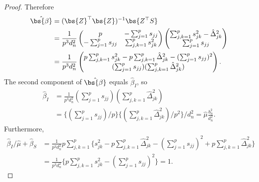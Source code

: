 \begin{proof}
Therefore
\begin{align*}
\hat{\bs{\beta}}& = (\bs{Z}^\top \bs{Z})^{-1} \bs{Z^\top S} \\
&= \frac{1}{p^3d_n^2}\begin{pmatrix}
p & -\sum_{j=1}^p s_{jj}\\
-\sum_{j=1}^p s_{jj} & \sum_{j,k=1}^ps_{jk}^2
\end{pmatrix}\begin{pmatrix}
\sum_{j,k=1}^ps_{jk}^2 - \hat{\Delta}_{jk}^2\\
\sum_{j=1}^p s_{jj}
\end{pmatrix}\\
&= \frac{1}{p^3d_n^2}\begin{pmatrix}
 p\sum_{j,k=1}^p s_{jk}^2 -p\sum_{j,k=1}^p\hat{\Delta}_{jk}^2-(\sum_{j=1}^ps_{jj})^2\\
 (\sum_{j=1}^ps_{jj}) (\sum_{j,k=1}^p\hat{\Delta}_{jk}^2)
\end{pmatrix}.
\end{align*}
The second component of $\hat{\bs{\beta}}$ equals $\hat{\beta}_I$, so
\begin{align*}
\hat{\beta}_I &= \frac{1}{p^3d_n^2} (\sum_{j=1}^ps_{jj}) (\sum_{j,k=1}^p\hat{\Delta}_{jk}^2)\\
&=\{(\sum_{j=1}^ps_{jj})/p\}   \{(\sum_{j,k=1}^p\hat{\Delta}_{jk}^2)/p^2 \} / d_n^2
=\hat{\mu}\frac{b_n^2}{d_n^2}.
\end{align*}
Furthermore,
\begin{align*}
\hat{\beta}_I /\hat{\mu} + \hat{\beta}_S &= \frac{1}{p^3d_n^2}p\sum_{j,k=1}^p \{s_{jk}^2 -p\sum_{j,k=1}^p\hat{\Delta}_{jk}^2-(\sum_{j=1}^ps_{jj})^2+p\sum_{j,k=1}^p\hat{\Delta}_{jk}^2\}\\
&=\frac{1}{p^3d_n^2}\{p\sum_{j,k=1}^p s_{jk}^2 -(\sum_{j=1}^ps_{jj})^2\}
=
1.
\end{align*}
\end{proof}
